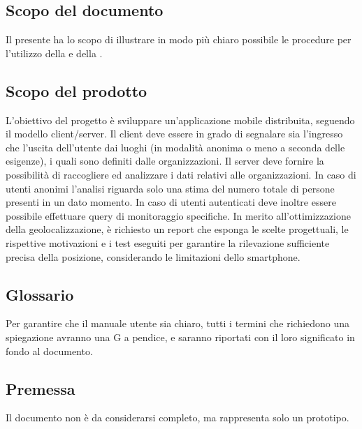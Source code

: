 \documentclass[../analisi-dei-requisiti.tex]{subfiles}
\begin{document}
\subsection{Scopo del documento}%
\label{sub:scopo_del_documento}
Il presente  ha lo scopo di illustrare in modo più chiaro possibile le procedure per l'utilizzo della  e della .

\subsection{Scopo del prodotto}%
\label{sub:scopo_del_prodotto}
L'obiettivo del progetto è sviluppare un'applicazione mobile distribuita, seguendo il modello client/server.
Il client deve essere in grado di segnalare sia l'ingresso che l'uscita dell'utente dai luoghi (in modalità anonima o meno a seconda delle esigenze), i quali sono definiti dalle organizzazioni.
Il server deve fornire la possibilità di raccogliere ed analizzare i dati relativi alle organizzazioni.
In caso di utenti anonimi l'analisi riguarda solo una stima del numero totale di persone presenti in un dato momento.
In caso di utenti autenticati deve inoltre essere possibile effettuare query di monitoraggio specifiche.
In merito all'ottimizzazione della geolocalizzazione, è richiesto un report che esponga le scelte progettuali, le rispettive motivazioni e i test eseguiti per garantire la rilevazione sufficiente precisa della posizione, considerando le limitazioni dello smartphone.

\subsection{Glossario}%
\label{sub:glossario}
Per garantire che il manuale utente sia chiaro, tutti i termini che richiedono una spiegazione avranno una G a pendice, e saranno riportati con il loro significato in fondo al documento.

\subsection{Premessa}%
\label{sub:glossario}
Il documento non è da considerarsi completo, ma rappresenta solo un prototipo.
\end{document}
